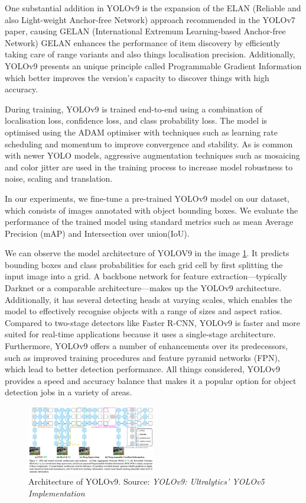 \documentclass{IEEEtran}
\begin{document}
	One substantial addition in YOLOv9 is the expansion of the ELAN (Reliable and also Light-weight Anchor-free Network) approach recommended in the YOLOv7 paper, causing GELAN (International Extremum Learning-based Anchor-free Network) GELAN enhances the performance of item discovery by efficiently taking care of range variants and also things localisation precision. Additionally, YOLOv9 presents an unique principle called Programmable Gradient Information which better improves the version's capacity to discover things with high accuracy.
	
	During training, YOLOv9 is trained end-to-end using a combination of localisation loss, confidence loss, and class probability loss. The model is optimised using the ADAM optimiser with techniques such as learning rate scheduling and momentum to improve convergence and stability. As is common with newer YOLO models, aggressive augmentation techniques such as mosaicing and color jitter are used in the training process to increase model robustness to noise, scaling and translation.
	
	In our experiments, we fine-tune a pre-trained YOLOv9 model on our dataset, which consists of images annotated with object bounding boxes. We evaluate the performance of the trained model using standard metrics such as mean Average Precision (mAP) and Intersection over union(IoU).
	
	We can observe the model architecture of YOLOV9 in the image \ref{fig:yolov9_architecture}. It predicts bounding boxes and class probabilities for each grid cell by first splitting the input image into a grid. A backbone network for feature extraction—typically Darknet or a comparable architecture—makes up the YOLOv9 architecture. Additionally, it has several detecting heads at varying scales, which enables the model to effectively recognise objects with a range of sizes and aspect ratios. Compared to two-stage detectors like Faster R-CNN, YOLOv9 is faster and more suited for real-time applications because it uses a single-stage architecture. Furthermore, YOLOv9 offers a number of enhancements over its predecessors, such as improved training procedures and feature pyramid networks (FPN), which lead to better detection performance. All things considered, YOLOv9 provides a speed and accuracy balance that makes it a popular option for object detection jobs in a variety of areas.
	
	\begin{figure}[htbp]
		\centering
		\includegraphics[width=0.5\textwidth]{images/yolov9.png}
		\caption{Architecture of YOLOv9. Source: \textit{YOLOv9: Ultralytics' YOLOv5 Implementation}~\cite{ultralytics_yolov9}}
		\label{fig:yolov9_architecture}
	\end{figure}
\end{document}
